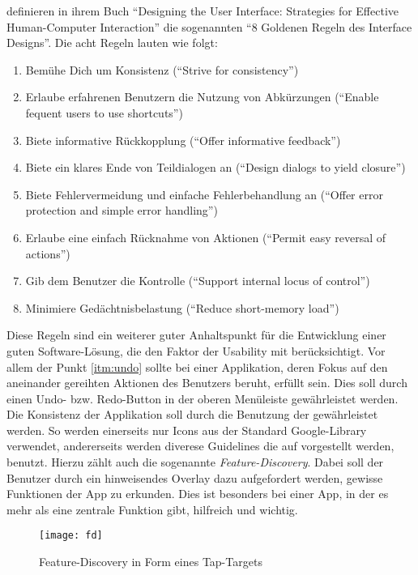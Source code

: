 \citeauthor{Shneiderman04} definieren in ihrem Buch ``Designing the User Interface: Strategies for Effective Human-Computer Interaction'' die sogenannten ``8 Goldenen Regeln des Interface Designs''.  Die acht Regeln lauten wie folgt:

\begin{enumerate}
  \item Bemühe Dich um Konsistenz (``Strive for consistency'')
  \item Erlaube erfahrenen Benutzern die Nutzung von Abkürzungen (``Enable fequent users to use shortcuts'')
  \item Biete informative Rückkopplung (``Offer informative feedback'')
  \item Biete ein klares Ende von Teildialogen an (``Design dialogs to yield closure'')
  \item Biete Fehlervermeidung und einfache Fehlerbehandlung an (``Offer error protection and simple error handling'')
  \item \label{itm:undo} Erlaube eine einfach Rücknahme von Aktionen (``Permit easy reversal of actions'')
  \item Gib dem Benutzer die Kontrolle (``Support internal locus of control'')
  \item Minimiere Gedächtnisbelastung (``Reduce short-memory load'')
\end{enumerate} 

Diese Regeln sind ein weiterer guter Anhaltspunkt für die Entwicklung einer guten Software-Lösung, die den Faktor der Usability mit berücksichtigt. Vor allem der Punkt \autoref{itm:undo} sollte bei einer Applikation, deren Fokus auf den aneinander gereihten Aktionen des Benutzers beruht, erfüllt sein. Dies soll durch einen Undo- bzw. Redo-Button in der oberen Menüleiste gewährleistet werden. \\

Die Konsistenz der Applikation soll durch die Benutzung der \citet{AndroidMG} gewährleistet werden. 
So werden einerseits nur Icons aus der Standard Google-Library verwendet, andererseits werden diverese Guidelines die auf \citet{AndroidMG} vorgestellt werden, benutzt. 
Hierzu zählt auch die sogenannte \emph{Feature-Discovery}.
Dabei soll der Benutzer durch ein hinweisendes Overlay dazu aufgefordert werden, gewisse Funktionen der App zu erkunden. 
Dies ist besonders bei einer App, in der es mehr als eine zentrale Funktion gibt, hilfreich und wichtig. \\

\begin{figure}[h]
  \centering
  \texttt{[image: fd]}
  \caption{Feature-Discovery in Form eines Tap-Targets}
  \label{fig:fd}
\end{figure}

